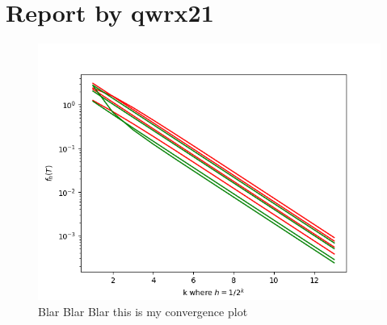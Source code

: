 \documentclass{article}
\begin{document}
\section*{Report by qwrx21}

\begin{figure}[h!]
    \includegraphics[scale=1]{convergence.png}
    \caption{Blar Blar Blar this is my convergence plot}
    \label{fig:birds}
  \end{figure}
\end{document}
